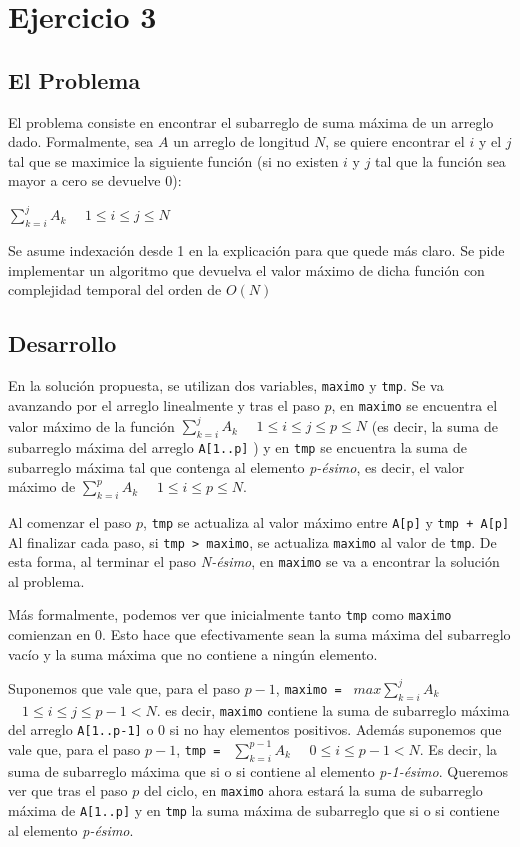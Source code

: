 \section{Ejercicio 3}
\subsection{El Problema}
El problema consiste en encontrar el subarreglo de suma máxima de un arreglo dado. Formalmente, sea $A$ un arreglo de longitud $N$, se quiere encontrar el $i$ y el $j$ tal que se maximice la siguiente función (si no existen $i$ y $j$ tal que la función sea mayor a cero se devuelve 0): 
\begin{center} $\sum_{k=i}^{j} A_k$            $ \quad 1\leq i\leq j\leq N$
\end{center}
Se asume indexación desde 1 en la explicación para que quede más claro.
Se pide implementar un algoritmo que devuelva el valor máximo de dicha función con complejidad temporal del orden de $O(N)$
\subsection{Desarrollo}
En la solución propuesta, se utilizan dos variables, \texttt{maximo} y \texttt{tmp}. Se va avanzando por el arreglo linealmente y tras el paso $p$, en  \texttt{maximo} se encuentra el valor máximo de la función $\sum_{k=i}^{j} A_k$            $ \quad 1\leq i\leq j\leq p \leq N$ (es decir, la suma de subarreglo máxima del arreglo  \texttt{A[1..p]} ) y en  \texttt{tmp} se encuentra la suma de subarreglo máxima tal que contenga al elemento \emph{p-ésimo}, es decir, el valor máximo de  $\sum_{k=i}^{p} A_k$            $ \quad 1\leq i\leq p\leq N$.


Al comenzar el paso $p$,  \texttt{tmp} se actualiza al valor máximo entre  \texttt{A[p]} y  \texttt{tmp + A[p]}
Al finalizar cada paso, si  \texttt{tmp > maximo}, se actualiza  \texttt{maximo} al valor de  \texttt{tmp}.
De esta forma, al terminar el paso \emph{N-ésimo}, en \texttt{maximo} se va a encontrar la solución al problema.

Más formalmente, podemos ver que inicialmente tanto \texttt{tmp} como \texttt{maximo} comienzan en 0. Esto hace que efectivamente sean la suma máxima del subarreglo vacío y la suma máxima que no contiene a ningún elemento.

Suponemos que vale que, para el paso $p-1$, \texttt{maximo = } $ max \sum_{k=i}^{j} A_k$            $ \quad 1\leq i\leq j\leq p-1 < N$. es decir, \texttt{maximo} contiene la suma de subarreglo máxima del arreglo \texttt{A[1..p-1]} o 0 si no hay elementos positivos. Además suponemos que vale que, para el paso $p-1$, \texttt{tmp = } $\sum_{k=i}^{p-1} A_k$            $ \quad 0\leq i\leq p-1 < N$. Es decir, la suma de subarreglo máxima que si o si contiene al elemento \emph{p-1-ésimo}. Queremos ver que tras el paso $p$ del ciclo, en \texttt{maximo} ahora estará la suma de subarreglo máxima de \texttt{A[1..p]} y en \texttt{tmp} la suma máxima de subarreglo que si o si contiene al elemento \emph{p-ésimo}. 

